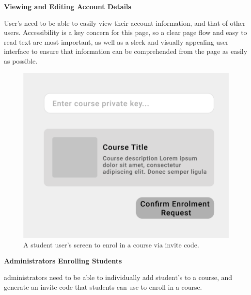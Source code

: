 \textbf{Viewing and Editing Account Details}

User's need to be able to easily view their account information, and that of other users. Accessibility is a key concern for this page, so a clear page flow and easy to read text are most important, as well as a sleek and visually appealing user interface to ensure that information can be comprehended from the page as easily as possible.

\begin{figure}[h!]
  \centering
  \includegraphics[scale=0.2]{images/accounts-code}
  \caption{A student user's screen to enrol in a course via invite code.}
\end{figure}

\textbf{Administrators Enrolling Students}

administrators need to be able to individually add student's to a course, and generate an invite code that students can use to enroll in a course. 


